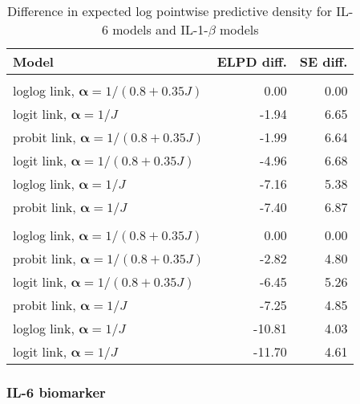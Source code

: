 \documentclass[
]{article}
\begin{document}
\begin{table}

\caption{\label{tab:elpdtab}Difference in expected log pointwise predictive density for IL-6 models and IL-1-$\beta$ models}
\centering
\begin{tabular}[t]{lrr}
\toprule
Model & ELPD diff. & SE diff.\\
\midrule
\addlinespace[0.3em]
\multicolumn{3}{l}{\textbf{IL-6}}\\
\hspace{1em}loglog link, $\boldsymbol{\alpha}=1/(0.8+0.35J)$ & 0.00 & \vphantom{1} 0.00\\
\hspace{1em}logit link, $\boldsymbol{\alpha}=1/J$ & -1.94 & 6.65\\
\hspace{1em}probit link, $\boldsymbol{\alpha}=1/(0.8+0.35J)$ & -1.99 & 6.64\\
\hspace{1em}logit link, $\boldsymbol{\alpha}=1/(0.8+0.35J)$ & -4.96 & 6.68\\
\hspace{1em}loglog link, $\boldsymbol{\alpha}=1/J$ & -7.16 & 5.38\\
\hspace{1em}probit link, $\boldsymbol{\alpha}=1/J$ & -7.40 & 6.87\\
\addlinespace[0.3em]
\multicolumn{3}{l}{\textbf{IL-1-$\beta$}}\\
\hspace{1em}loglog link, $\boldsymbol{\alpha}=1/(0.8+0.35J)$ & 0.00 & 0.00\\
\hspace{1em}probit link, $\boldsymbol{\alpha}=1/(0.8+0.35J)$ & -2.82 & 4.80\\
\hspace{1em}logit link, $\boldsymbol{\alpha}=1/(0.8+0.35J)$ & -6.45 & 5.26\\
\hspace{1em}probit link, $\boldsymbol{\alpha}=1/J$ & -7.25 & 4.85\\
\hspace{1em}loglog link, $\boldsymbol{\alpha}=1/J$ & -10.81 & 4.03\\
\hspace{1em}logit link, $\boldsymbol{\alpha}=1/J$ & -11.70 & 4.61\\
\bottomrule
\end{tabular}
\end{table}

\hypertarget{il-6-biomarker}{%
\subsubsection{IL-6 biomarker}\label{il-6-biomarker}}
\end{document}

